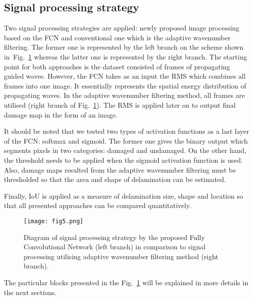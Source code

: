 \subsection{Signal processing strategy}
Two signal processing strategies are applied: newly proposed image processing based on the FCN and conventional one which is the adaptive wavenumber filtering.
The former one is represented by the left branch on the scheme shown in~Fig.~\ref{fig:sig_proc_strategy} whereas the latter one is represented by the right branch.
The starting point for both approaches is the dataset consisted of frames of propagating guided waves.
However, the FCN takes as an input the RMS which combines all frames into one image. 
It essentially represents the spatial energy distribution of propagating waves.
In the adaptive wavenumber filtering method, all frames are utilised (right branch of Fig.~\ref{fig:sig_proc_strategy}).
The RMS is applied later on to output final damage map in the form of an image.

It should be noted that we tested two types of activation functions as a last layer of the FCN: softmax and sigmoid.
The former one gives the binary output which segments pixels in two categories: damaged and undamaged.
On the other hand, the threshold needs to be applied when the sigmoid activation function is used.
Also, damage maps resulted from the adaptive wavenumber filtering must be thresholded so that the area and shape of delamination can be estimated.

Finally, IoU is applied as a measure of delamination size, shape and location so that all presented approaches can be compared quantitatively. 
	\begin{figure}
		\centering
		\texttt{[image: fig5.png]}
		\caption{Diagram of signal processing strategy by the proposed Fully Convolutional Network (left branch) in comparison to signal processing utilising adaptive wavenumber filtering method (right branch). }
		\label{fig:sig_proc_strategy}
	\end{figure}
The particular blocks presented in the Fig.~\ref{fig:sig_proc_strategy} will be explained in more details in the next sections.